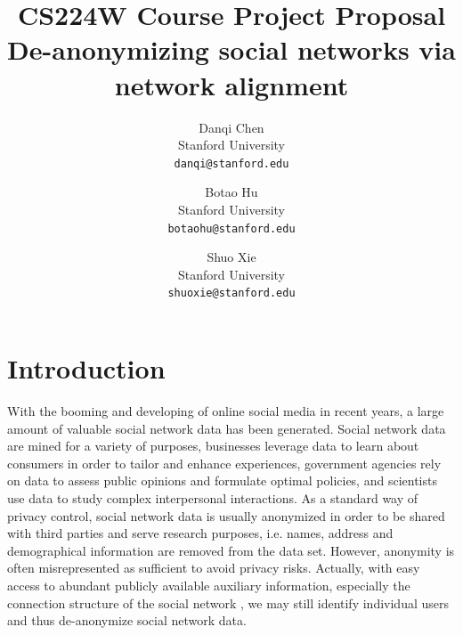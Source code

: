 \documentclass[11pt,letterpaper]{article}
\begin{document}
\title{{CS224W Course Project Proposal \\} \bf De-anonymizing social networks via network alignment}

\author{Danqi Chen\\
Stanford University\\
{\tt\small danqi@stanford.edu}
\and
Botao Hu\\
Stanford University\\
{\tt\small botaohu@stanford.edu}
%
\and
Shuo Xie\\
Stanford University\\
{\tt\small shuoxie@stanford.edu}
}

\maketitle
\thispagestyle{empty}

\maketitle

\section{Introduction}

With the booming and developing of online social media in recent years, a large amount of valuable social network data has been generated. Social network data are mined for a variety of purposes, businesses leverage data to learn about consumers in order to tailor and enhance experiences, government agencies rely on data to assess public opinions and formulate optimal policies, and scientists use data to study complex interpersonal interactions. As a standard way of privacy control, social network data is usually anonymized in order to be shared with third parties and serve research purposes, i.e. names, address and demographical information are removed from the data set. However, anonymity is often misrepresented as sufficient to avoid privacy risks. Actually, with easy access to abundant publicly available auxiliary information, especially the connection structure of the social network , we may still identify individual users and thus de-anonymize social network data.
\end{document}
